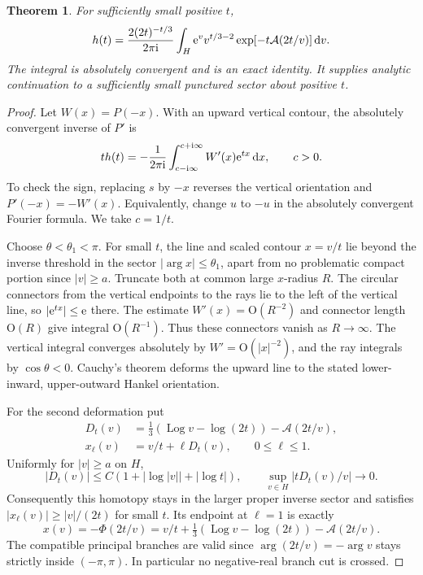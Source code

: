 \documentclass[11pt,letterpaper]{article}
\newtheorem{theorem}{Theorem}[section]
\theoremstyle{remark}\newtheorem{remark}[theorem]{Remark}
\newcommand{\ii}{\mathrm i}\newcommand{\dd}{\,\mathrm d}
\newcommand{\Oh}{\mathrm O}\newcommand{\supp}{\operatorname{supp}}
\newcommand{\Log}{\operatorname{Log}}
\begin{document}
\begin{theorem}\label{ied:log:thm:hankel}
For sufficiently small positive $t$,
\begin{equation}\label{ied:log:eq:hankel}
 h(t)=\frac{2(2t)^{-t/3}}{2\pi\ii}
 \int_H\e^v v^{t/3-2}\exp[-t\mathcal A(2t/v)]\dd v.
\end{equation}
The integral is absolutely convergent and is an exact identity. It supplies analytic continuation to a sufficiently small punctured sector about positive $t$.
\end{theorem}
\begin{proof}
Let $W(x)=P(-x)$. With an upward vertical contour, the absolutely convergent inverse of $P'$ is
\begin{equation}\label{ied:log:eq:bromwich}
 t h(t)=-\frac1{2\pi\ii}
 \int_{c-\ii\infty}^{c+\ii\infty}W'(x)\e^{tx}\dd x,
 \qquad c>0.
\end{equation}
To check the sign, replacing $s$ by $-x$ reverses the vertical orientation and $P'(-x)=-W'(x)$. Equivalently, change $u$ to $-u$ in the absolutely convergent Fourier formula. We take $c=1/t$.

Choose $\theta<\theta_1<\pi$. For small $t$, the line and scaled contour $x=v/t$ lie beyond the inverse threshold in the sector $|\arg x|\le\theta_1$, apart from no problematic compact portion since $|v|\ge a$. Truncate both at common large $x$-radius $R$. The circular connectors from the vertical endpoints to the rays lie to the left of the vertical line, so $|\mathrm e^{tx}|\le\mathrm e$ there. The estimate $W'(x)=\Oh(R^{-2})$ and connector length $\Oh(R)$ give integral $\Oh(R^{-1})$. Thus these connectors vanish as $R\to\infty$. The vertical integral converges absolutely by $W'=\Oh(|x|^{-2})$, and the ray integrals by $\cos\theta<0$. Cauchy's theorem deforms the upward line to the stated lower-inward, upper-outward Hankel orientation.

For the second deformation put
\begin{align*}
 D_t(v)&=\tfrac13(\Log v-\log(2t))-\mathcal A(2t/v),\\
 x_\ell(v)&=v/t+\ell D_t(v),\qquad 0\le\ell\le1.
\end{align*}
Uniformly for $|v|\ge a$ on $H$,
\[
 |D_t(v)|\le C(1+|\log|v||+|\log t|),\qquad
 \sup_{v\in H}|tD_t(v)/v|\longrightarrow0.
\]
Consequently this homotopy stays in the larger proper inverse sector and satisfies $|x_\ell(v)|\ge|v|/(2t)$ for small $t$. Its endpoint at $\ell=1$ is exactly
\begin{equation}\label{ied:log:eq:xv}
 x(v)=-\Phi(2t/v)
 =v/t+\tfrac13(\Log v-\log(2t))-\mathcal A(2t/v).
\end{equation}
The compatible principal branches are valid since $\arg(2t/v)=-\arg v$ stays strictly inside $(-\pi,\pi)$. In particular no negative-real branch cut is crossed.


\end{proof}
\end{document}
